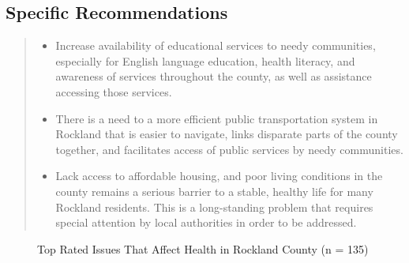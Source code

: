 \documentclass[
  english,
  letterpaper,
]{report}
\begin{document}
\subsection{Specific Recommendations}\label{specific-recommendations-3}

\begin{quote}
\begin{itemize}
\item
  Increase availability of educational services to needy communities,
  especially for English language education, health literacy, and
  awareness of services throughout the county, as well as assistance
  accessing those services.
\item
  There is a need to a more efficient public transportation system in
  Rockland that is easier to navigate, links disparate parts of the
  county together, and facilitates access of public services by needy
  communities.
\item
  Lack access to affordable housing, and poor living conditions in the
  county remains a serious barrier to a stable, healthy life for many
  Rockland residents. This is a long-standing problem that requires
  special attention by local authorities in order to be addressed.
\end{itemize}
\end{quote}

\begin{figure}


\caption{\label{fig-rc-affect-health}Top Rated Issues That Affect Health
in Rockland County (n = 135)}

\end{figure}%
\end{document}
